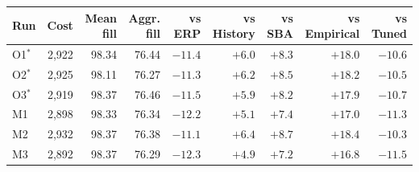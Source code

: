 \begin{tabular}{l r r r r r r r r}
\hline
Run & Cost & Mean fill & Aggr. fill & vs ERP & vs History & vs SBA & vs Empirical & vs Tuned \\
\hline
O1$^{*}$ & 2,922 & 98.34 & 76.44 & $-11.4$ & $+6.0$ & $+8.3$ & $+18.0$ & $-10.6$ \\
O2$^{*}$ & 2,925 & 98.11 & 76.27 & $-11.3$ & $+6.2$ & $+8.5$ & $+18.2$ & $-10.5$ \\
O3$^{*}$ & 2,919 & 98.37 & 76.46 & $-11.5$ & $+5.9$ & $+8.2$ & $+17.9$ & $-10.7$ \\
M1 & 2,898 & 98.33 & 76.34 & $-12.2$ & $+5.1$ & $+7.4$ & $+17.0$ & $-11.3$ \\
M2 & 2,932 & 98.37 & 76.38 & $-11.1$ & $+6.4$ & $+8.7$ & $+18.4$ & $-10.3$ \\
M3 & 2,892 & 98.37 & 76.29 & $-12.3$ & $+4.9$ & $+7.2$ & $+16.8$ & $-11.5$ \\
\hline
\end{tabular}
